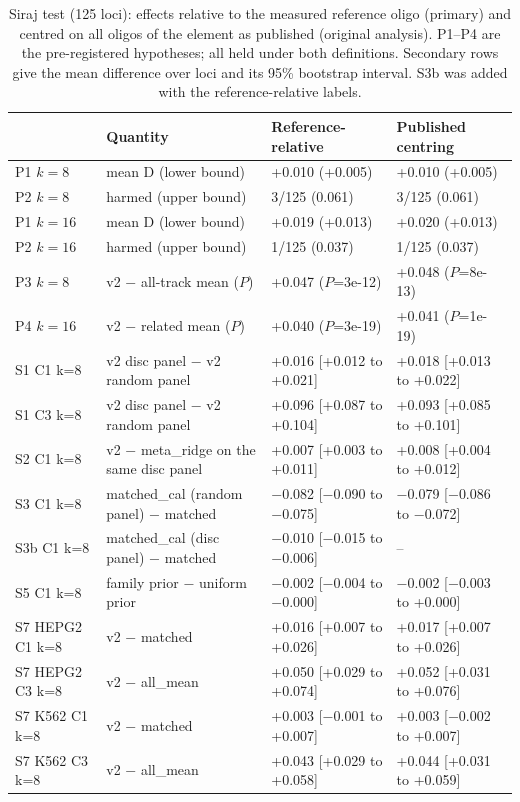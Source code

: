 \begin{table}[H]
\caption{Siraj test (125 loci): effects relative to the measured reference oligo (primary) and centred on all oligos of the element as published (original analysis). P1--P4 are the pre-registered hypotheses; all held under both definitions. Secondary rows give the mean difference over loci and its 95\% bootstrap interval. S3b was added with the reference-relative labels.}\label{tab:s1}
\centering\small
\begin{tabular}{llll}
\toprule
 & Quantity & Reference-relative & Published centring \\
\midrule
P1 $k=8$ & mean D (lower bound) & +0.010 (+0.005) & +0.010 (+0.005) \\
P2 $k=8$ & harmed (upper bound) & 3/125 (0.061) & 3/125 (0.061) \\
P1 $k=16$ & mean D (lower bound) & +0.019 (+0.013) & +0.020 (+0.013) \\
P2 $k=16$ & harmed (upper bound) & 1/125 (0.037) & 1/125 (0.037) \\
P3 $k=8$ & v2 $-$ all-track mean ($P$) & +0.047 ($P$=3e-12) & +0.048 ($P$=8e-13) \\
P4 $k=16$ & v2 $-$ related mean ($P$) & +0.040 ($P$=3e-19) & +0.041 ($P$=1e-19) \\
S1 C1 k=8 & v2 disc panel $-$ v2 random panel & +0.016 [+0.012 to +0.021] & +0.018 [+0.013 to +0.022] \\
S1 C3 k=8 & v2 disc panel $-$ v2 random panel & +0.096 [+0.087 to +0.104] & +0.093 [+0.085 to +0.101] \\
S2 C1 k=8 & v2 $-$ meta\_ridge on the same disc panel & +0.007 [+0.003 to +0.011] & +0.008 [+0.004 to +0.012] \\
S3 C1 k=8 & matched\_cal (random panel) $-$ matched & $-$0.082 [$-$0.090 to $-$0.075] & $-$0.079 [$-$0.086 to $-$0.072] \\
S3b C1 k=8 & matched\_cal (disc panel) $-$ matched & $-$0.010 [$-$0.015 to $-$0.006] & -- \\
S5 C1 k=8 & family prior $-$ uniform prior & $-$0.002 [$-$0.004 to $-$0.000] & $-$0.002 [$-$0.003 to +0.000] \\
S7 HEPG2 C1 k=8 & v2 $-$ matched & +0.016 [+0.007 to +0.026] & +0.017 [+0.007 to +0.026] \\
S7 HEPG2 C3 k=8 & v2 $-$ all\_mean & +0.050 [+0.029 to +0.074] & +0.052 [+0.031 to +0.076] \\
S7 K562 C1 k=8 & v2 $-$ matched & +0.003 [$-$0.001 to +0.007] & +0.003 [$-$0.002 to +0.007] \\
S7 K562 C3 k=8 & v2 $-$ all\_mean & +0.043 [+0.029 to +0.058] & +0.044 [+0.031 to +0.059] \\
\bottomrule
\end{tabular}
\end{table}

